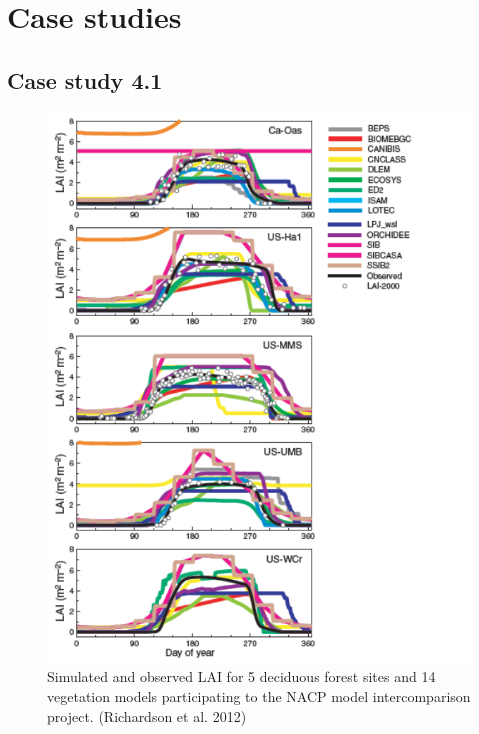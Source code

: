 \documentclass[12pt,oneside]{book}
\begin{document}
\section{Case studies}\label{case-studies-2}

\subsection{Case study 4.1}\label{case-study-4.1}

\begin{figure}

{\centering \includegraphics[width=0.8\linewidth]{figures/chap4/f47_LAI_richardson} 

}

\caption{Simulated and observed LAI for 5 deciduous forest sites and 14 vegetation models participating to the NACP model intercomparison project. (Richardson et al. 2012)}\label{fig:f47}
\end{figure}
\end{document}
